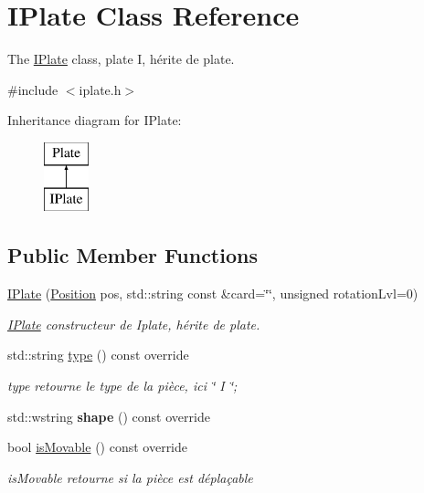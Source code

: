 \hypertarget{class_i_plate}{}\section{I\+Plate Class Reference}
\label{class_i_plate}


The \mbox{\hyperlink{class_i_plate}{I\+Plate}} class, plate I, hérite de plate.  




{\ttfamily \#include $<$iplate.\+h$>$}

Inheritance diagram for I\+Plate\+:\begin{figure}[H]
\begin{center}
\leavevmode
\includegraphics[height=2.000000cm]{class_i_plate}
\end{center}
\end{figure}
\subsection*{Public Member Functions}
\begin{DoxyCompactItemize}
\item 
\mbox{\hyperlink{class_i_plate_a04a539c5fe3d2ab2ba28a686ed14f65f}{I\+Plate}} (\mbox{\hyperlink{class_position}{Position}} pos, std\+::string const \&card=\char`\"{}\char`\"{}, unsigned rotation\+Lvl=0)
\begin{DoxyCompactList}\small\item\em \mbox{\hyperlink{class_i_plate}{I\+Plate}} constructeur de Iplate, hérite de plate. \end{DoxyCompactList}\item 
std\+::string \mbox{\hyperlink{class_i_plate_ace93dd5814447d91b8241d2713dfe453}{type}} () const override
\begin{DoxyCompactList}\small\item\em type retourne le type de la pièce, ici \char`\"{} I \char`\"{}; \end{DoxyCompactList}\item 
\mbox{\label{class_i_plate_adf12fb45a34ceb075647176714805f91}} 
std\+::wstring {\bfseries shape} () const override
\item 
bool \mbox{\hyperlink{class_i_plate_af3b5ab4e6f8863d49ea2938a8dbaa389}{is\+Movable}} () const override
\begin{DoxyCompactList}\small\item\em is\+Movable retourne si la pièce est déplaçable \end{DoxyCompactList}\end{DoxyCompactItemize}
